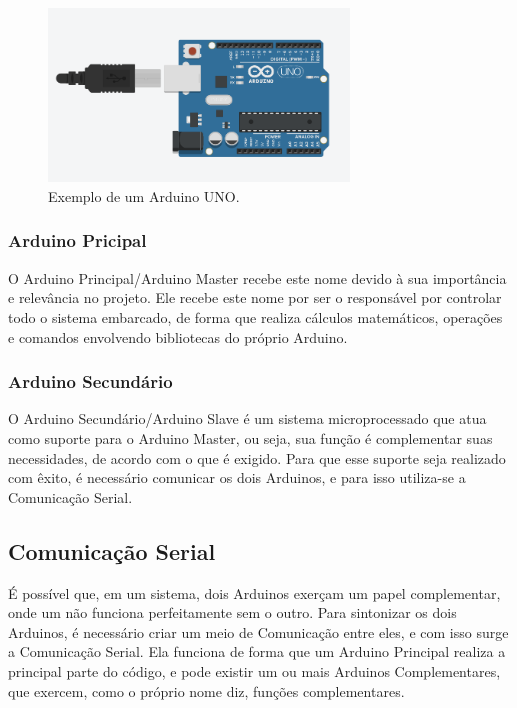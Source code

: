 \documentclass[conference]{IEEEtran}
\begin{document}
\begin{figure}[htbp]
    \centerline{
        \includegraphics[width=8cm]{images/Arduino_UNO.png}
        }
    \caption{Exemplo de um Arduino UNO.}
    \label{fig}
    \end{figure}

\subsubsection{Arduino Pricipal}

    O Arduino Principal/Arduino Master recebe este nome devido à sua importância e relevância no projeto.
Ele recebe este nome por ser o responsável por controlar todo o sistema embarcado, de forma que realiza
cálculos matemáticos, operações e comandos envolvendo bibliotecas do próprio Arduino.

\subsubsection{Arduino Secundário}

    O Arduino Secundário/Arduino Slave é um sistema microprocessado que atua como suporte para o 
Arduino Master, ou seja, sua função é complementar suas necessidades, de acordo com o que é exigido.
Para que esse suporte seja realizado com êxito, é necessário comunicar os dois Arduinos, e para isso
utiliza-se a Comunicação Serial.

\subsection{Comunicação Serial}

    É possível que, em um sistema, dois Arduinos exerçam um papel complementar, onde um não funciona
perfeitamente sem o outro. Para sintonizar os dois Arduinos, é necessário criar um meio de Comunicação
entre eles, e com isso surge a Comunicação Serial. Ela funciona de forma que um Arduino Principal realiza
a principal parte do código, e pode existir um ou mais Arduinos Complementares, que exercem, como o próprio
nome diz, funções complementares.
\end{document}
